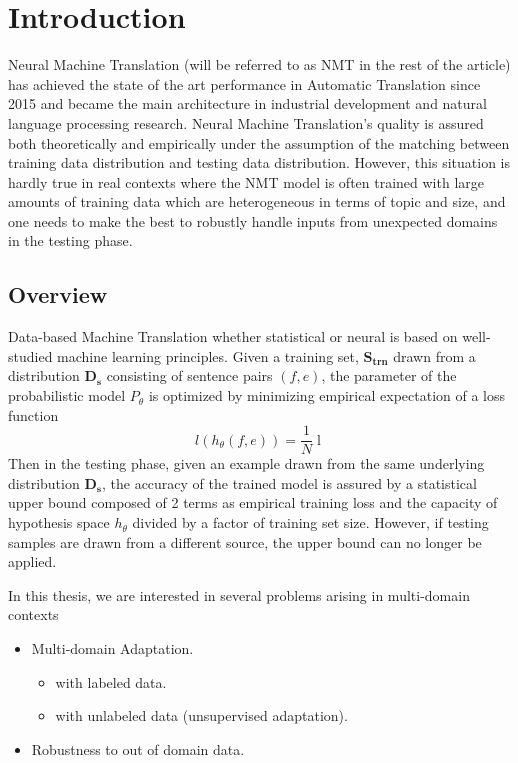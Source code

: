\documentclass[12pt,a4paper,twoside]{report}
\theoremstyle{definition}
\begin{document}
\setlength{\belowdisplayskip}{8pt} \setlength{\belowdisplayshortskip}{8pt}
\setlength{\abovedisplayskip}{8pt} \setlength{\abovedisplayshortskip}{8pt}
\setlength{\parskip}{0.1cm}
\setlength{\parindent}{1em}
\section*{Introduction}
Neural Machine Translation (will be referred to as NMT in the rest of the article) has achieved the state of the art performance in Automatic Translation since 2015 and became the main architecture in industrial development and natural language processing research. Neural Machine Translation’s quality is assured both theoretically and empirically under the assumption of the matching between training data distribution and testing data distribution. However, this situation is hardly true in real contexts where the NMT model is often trained with large amounts of training data which are heterogeneous in terms of topic and size, and one needs to make the best to robustly handle inputs from unexpected domains in the testing phase.
\subsection*{Overview}
Data-based Machine Translation whether statistical or neural is based on well-studied machine learning principles. Given a training set, $\mathbf{S_{trn}}$ drawn from a distribution $\mathbf{D_s}$ consisting of sentence pairs $(f,e)$, the parameter of the probabilistic model $P_{\theta}$ is optimized by minimizing empirical expectation of a loss function
$$l(h_{\theta}(f,e)) = \frac{1}{N}\displaystyle{\mathop{\sum_{(f,e)\in \mathbf{S_{trn}}}l(h_{\theta}(f,e))}}$$
Then in the testing phase, given an example drawn from the same underlying distribution $\mathbf{D_s}$, the accuracy of the trained model is assured by a statistical upper bound composed of 2 terms as empirical training loss and the capacity of hypothesis space $h_{\theta}$ divided by a factor of training set size. However, if testing samples are drawn from a different source, the upper bound can no longer be applied.

In this thesis, we are interested in several problems arising in multi-domain contexts
\begin{itemize}
	\item Multi-domain Adaptation.
		\begin{itemize}
			\item with labeled data.
			\item with unlabeled data (unsupervised adaptation).
		\end{itemize}
	\item Robustness to out of domain data.
\end{itemize}
\end{document}
